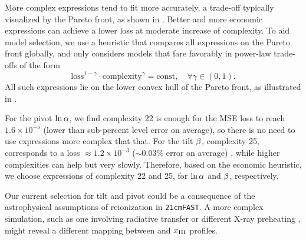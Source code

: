 More complex expressions tend to fit more accurately, a trade-off
typically visualized by the Pareto front, as shown in .
Better and more economic expressions can achieve a lower loss at
moderate increase of complexity.
To aid model selection, we use a heuristic that compares all expressions
on the Pareto front globally, and only considers models that fare
favorably in power-law trade-offs of the form
%
\begin{equation}
\mathrm{loss}^{1 - \gamma} \cdot \mathrm{complexity}^\gamma
= \mathrm{const}, \quad \forall \gamma \in (0, 1).
\end{equation}
All such expressions lie on the lower convex hull of the Pareto front,
as illustrated in .

For the pivot $\ln\alpha$, we find complexity 22 is enough for the MSE loss
to reach $1.6 \times 10^{-5}$ (lower than sub-percent level error on
average), so there is no need to use expressions more complex that that.
For the tilt $\beta$, complexity 25, corresponds to a loss $\approx
1.2\times10^{-3}$ ($\sim 0.03\%$ error on average) , while higher
complexities can help but very slowly.
Therefore, based on the economic heuristic, we choose expressions of
complexity 22 and 25, for $\ln\alpha$ and $\beta$, respectively.

Our current selection for tilt and pivot could be a consequence of the
astrophysical assumptions of reionization in \texttt{21cmFAST}.
A more complex simulation, such as one involving radiative transfer or
different X-ray preheating \cite{Montero2024}, might reveal a different
mapping between  and $x_{\mathrm{HI}}$ profiles.

